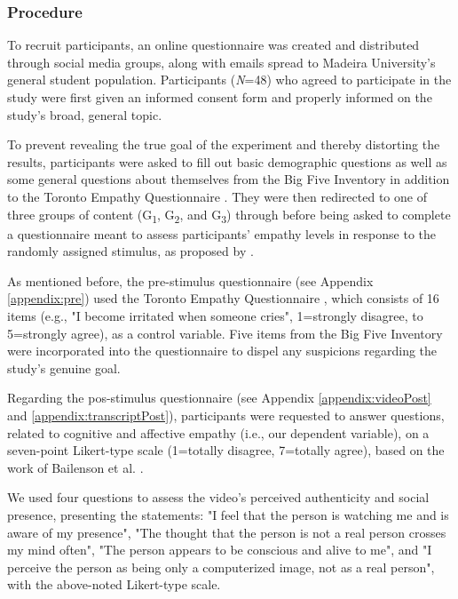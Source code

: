 \subsubsection{Procedure}
To recruit participants, an online questionnaire was created and distributed through social media groups, along with emails spread to Madeira University's general student population. Participants (\textit{N}=48) who agreed to participate in the study were first given an informed consent form and properly informed on the study's broad, general topic. 

To prevent revealing the true goal of the experiment and thereby distorting the results, participants were asked to fill out basic demographic questions as well as some general questions about themselves from the Big Five Inventory \cite{JOH91} in addition to the Toronto Empathy Questionnaire \cite{SPR03}. They were then redirected to one of three groups of content (G\textsubscript{1}, G\textsubscript{2}, and G\textsubscript{3}) through \cite{FER19} before being asked to complete a questionnaire meant to assess participants' empathy levels in response to the randomly assigned stimulus, as proposed by  \cite{ROT19, ZIB19}.

As mentioned before, the pre-stimulus questionnaire (see Appendix \ref{appendix:pre}) used the Toronto Empathy Questionnaire \cite{SPR03}, which consists of 16 items (e.g., "I become irritated when someone cries", 1=strongly disagree, to 5=strongly agree), as a control variable. Five items from the Big Five Inventory \cite{JOH91} were incorporated into the questionnaire to dispel any suspicions regarding the study's genuine goal.

Regarding the pos-stimulus questionnaire (see Appendix \ref{appendix:videoPost} and \ref{appendix:transcriptPost}), participants were requested to answer questions, related to cognitive and affective empathy  (i.e., our dependent variable), on a seven-point Likert-type scale (1=totally disagree, 7=totally agree), based on the work of Bailenson et al. \cite{BAI03}.

We used four questions to assess the video's perceived authenticity and social presence, presenting the statements: "I feel that the person is watching me and is aware of my presence", "The thought that the person is not a real person crosses my mind often", "The person appears to be conscious and alive to me", and "I perceive the person as being only a computerized image, not as a real person", with the above-noted Likert-type scale.

